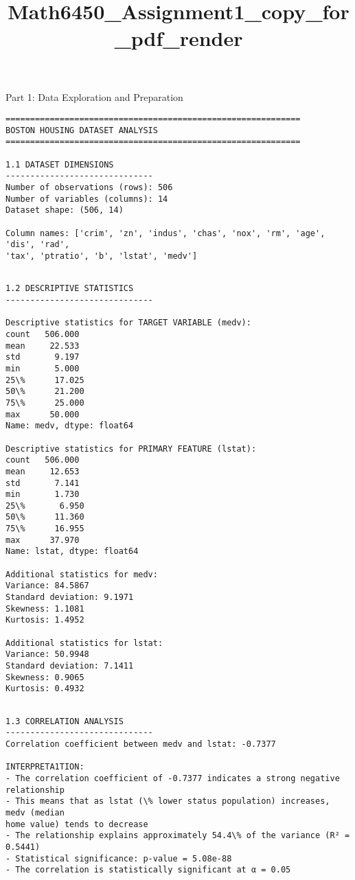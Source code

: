 \documentclass[11pt, twocolumn]{article}
\title{Math6450\_Assignment1\_copy\_for\_pdf\_render}
\begin{document}
    
    \maketitle
    
    

    
    Part 1: Data Exploration and Preparation

    \begin{Verbatim}[commandchars=\\\{\}]
============================================================
BOSTON HOUSING DATASET ANALYSIS
============================================================

1.1 DATASET DIMENSIONS
------------------------------
Number of observations (rows): 506
Number of variables (columns): 14
Dataset shape: (506, 14)

Column names: ['crim', 'zn', 'indus', 'chas', 'nox', 'rm', 'age', 'dis', 'rad',
'tax', 'ptratio', 'b', 'lstat', 'medv']
    \end{Verbatim}

    \begin{Verbatim}[commandchars=\\\{\}]

1.2 DESCRIPTIVE STATISTICS
------------------------------

Descriptive statistics for TARGET VARIABLE (medv):
count   506.000
mean     22.533
std       9.197
min       5.000
25\%      17.025
50\%      21.200
75\%      25.000
max      50.000
Name: medv, dtype: float64

Descriptive statistics for PRIMARY FEATURE (lstat):
count   506.000
mean     12.653
std       7.141
min       1.730
25\%       6.950
50\%      11.360
75\%      16.955
max      37.970
Name: lstat, dtype: float64

Additional statistics for medv:
Variance: 84.5867
Standard deviation: 9.1971
Skewness: 1.1081
Kurtosis: 1.4952

Additional statistics for lstat:
Variance: 50.9948
Standard deviation: 7.1411
Skewness: 0.9065
Kurtosis: 0.4932
    \end{Verbatim}

    \begin{Verbatim}[commandchars=\\\{\}]

1.3 CORRELATION ANALYSIS
------------------------------
Correlation coefficient between medv and lstat: -0.7377

INTERPRETA1TION:
- The correlation coefficient of -0.7377 indicates a strong negative
relationship
- This means that as lstat (\% lower status population) increases, medv (median
home value) tends to decrease
- The relationship explains approximately 54.4\% of the variance (R² = 0.5441)
- Statistical significance: p-value = 5.08e-88
- The correlation is statistically significant at α = 0.05
    \end{Verbatim}
\end{document}
